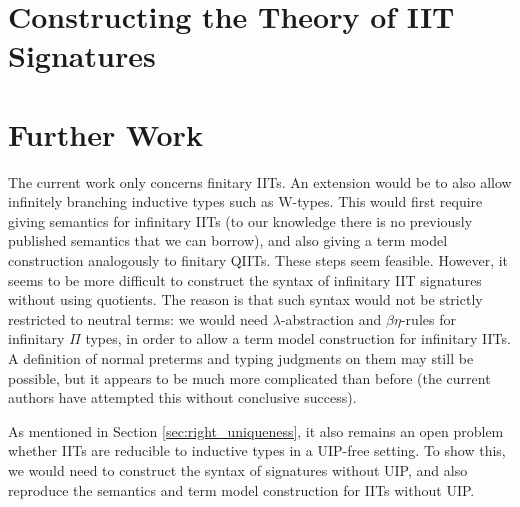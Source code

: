 \documentclass[a4paper,UKenglish,cleveref, autoref]{lipics-v2019}
\begin{document}

\section{Constructing the Theory of IIT Signatures}
\label{sec:ambroise}




\section{Further Work}

The current work only concerns finitary IITs. An extension would be to also
allow infinitely branching inductive types such as W-types. This would first
require giving semantics for infinitary IITs (to our knowledge there is no
previously published semantics that we can borrow), and also giving a term model
construction analogously to finitary QIITs. These steps seem feasible. However,
it seems to be more difficult to construct the syntax of infinitary IIT
signatures without using quotients. The reason is that such syntax would not be
strictly restricted to neutral terms: we would need $\lambda$-abstraction and
$\beta\eta$-rules for infinitary $\Pi$ types, in order to allow a term model
construction for infinitary IITs. A definition of normal preterms and typing
judgments on them may still be possible, but it appears to be much more
complicated than before (the current authors have attempted this without
conclusive success).

As mentioned in Section \ref{sec:right_uniqueness}, it also remains an open
problem whether IITs are reducible to inductive types in a UIP-free setting. To
show this, we would need to construct the syntax of signatures without UIP, and
also reproduce the semantics and term model construction for IITs without UIP.





\newpage

\appendix
\end{document}
